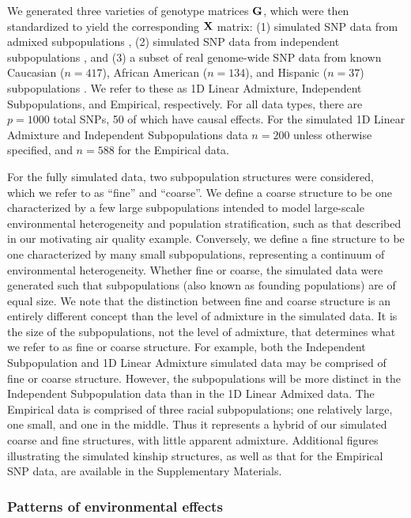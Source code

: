 We generated three varieties of genotype matrices $\mathbf{G}$, which were then standardized to yield the corresponding $\mathbf{X}$ matrix: (1) simulated SNP data from admixed subpopulations \citep{Ochoa2016}, (2) simulated SNP data from independent subpopulations \citep{Ochoa2016}, and (3) a subset of real genome-wide SNP data from known Caucasian ($n = 417$), African American ($n = 134$), and Hispanic ($n = 37$) subpopulations \citep{larkin2015objectives}. We refer to these as 1D Linear Admixture, Independent Subpopulations, and Empirical, respectively. For all data types, there are $p = 1000$ total SNPs, 50 of which have causal effects. For the simulated 1D Linear Admixture and Independent Subpopulations data $n = 200$ unless otherwise specified, and $n = 588$ for the Empirical data. 

For the fully simulated data, two subpopulation structures were considered, which we refer to as ``fine'' and ``coarse''.  We define a coarse structure to be one characterized by a few large subpopulations intended to model large-scale environmental heterogeneity and population stratification, such as that described in our motivating air quality example. Conversely, we define a fine structure to be one characterized by many small subpopulations, representing a continuum of environmental heterogeneity. Whether fine or coarse, the simulated data were generated such that subpopulations (also known as founding populations) are of equal size. We note that the distinction between fine and coarse structure is an entirely different concept than the level of admixture in the simulated data. It is the size of the subpopulations, not the level of admixture, that determines what we refer to as fine or coarse structure. For example, both the Independent Subpopulation and 1D Linear Admixture simulated data may be comprised of fine or coarse structure. However, the subpopulations will be more distinct in the Independent Subpopulation data than in the 1D Linear Admixed data. The Empirical data is comprised of three racial subpopulations; one relatively large, one small, and one in the middle. Thus it represents a hybrid of our simulated coarse and fine structures, with little apparent admixture. Additional figures illustrating the simulated kinship structures, as well as that for the Empirical SNP data, are available in the Supplementary Materials.

\subsubsection{Patterns of environmental effects}

